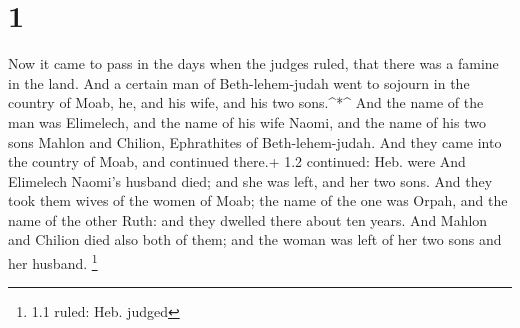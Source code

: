 \hypertarget{section}{%
\section{1}\label{section}}

 Now it came to pass in the days when the judges ruled, that
there was a famine in the land. And a certain man of Beth-lehem-judah
went to sojourn in the country of Moab, he, and his wife, and his two
sons.\^{}*\^{}  And the name of the man was Elimelech, and
the name of his wife Naomi, and the name of his two sons Mahlon and
Chilion, Ephrathites of Beth-lehem-judah. And they came into the country
of Moab, and continued there.+ 1.2 continued: Heb. were  And
Elimelech Naomi's husband died; and she was left, and her two sons.
 And they took them wives of the women of Moab; the name of
the one was Orpah, and the name of the other Ruth: and they dwelled
there about ten years.  And Mahlon and Chilion died also
both of them; and the woman was left of her two sons and her husband.
\footnote{1.1 ruled: Heb. judged}

